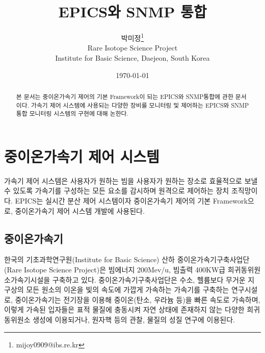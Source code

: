 \documentclass[11pt
  , a4paper
  , article
  , oneside
]{memoir}
\begin{document}
\newcommand{\technumber}{
  RAON Control-Document Series\\
  Revision : v0.1,   Release : Mar. 12. 2015}
\title{\textbf{EPICS와 SNMP 통합}}

\author{박미정\thanks{mijoy0909@ibs.re.kr} \\

  Rare Isotope Science Project\\
  Institute for Basic Science, Daejeon, South Korea
}
\date{\today}


\renewcommand{\maketitlehooka}{\begin{flushright}\textsf{\technumber}\end{flushright}}

\maketitle

\begin{abstract}
본 문서는 중이온가속기 제어의 기본 Framework이 되는 EPICS와 SNMP통합에 관한 문서이다. 가속기 제어 시스템에 사용되는 다양한 장비를 모니터링 및 제어하는 EPICS와 SNMP 통합 모니터링 시스템의 구현에 대해 논한다.
\end{abstract}

\chapter{중이온가속기 제어 시스템}
가속기 제어 시스템은 사용자가 원하는 빔을 사용자가 원하는 장소로 효율적으로 보낼 수 있도록 가속기를 구성하는 모든 요소를 감시하며 원격으로 제어하는 장치 조직망이다. EPICS는 실시간 분산 제어 시스템이자 중이온가속기 제어의 기본 Framework으로, 중이온가속기 제어 시스템 개발에 사용된다. 

\section{중이온가속기}
한국의 기초과학연구원(Institute for Basic Science) 산하 중이온가속기구축사업단(Rare Isotope Science Project)은 빔에너지 200Mev/u, 빔출력 400KW급 희귀동위원소가속기시설을 구축하고 있다. 중이온가속기구축사업단은 수소, 헬륨보다 무거운 지구상의 모든 원소의 이온을 빛의 속도에 가깝게 가속하는 가속기를 구축하는 연구시설로, 중이온가속기는 전기장을 이용해 중이온(탄소, 우라늄 등)을 빠른 속도로 가속하며, 이렇게 가속된 입자들은 표적 물질에 충동시켜 자연 상태에 존재하지 않는 다양한 희귀동위원소 생성에 이용되거나, 원자핵 등의 관찰, 물질의 성질 연구에 이용된다\citep{raon}\citep{risp}. 
\end{document}
